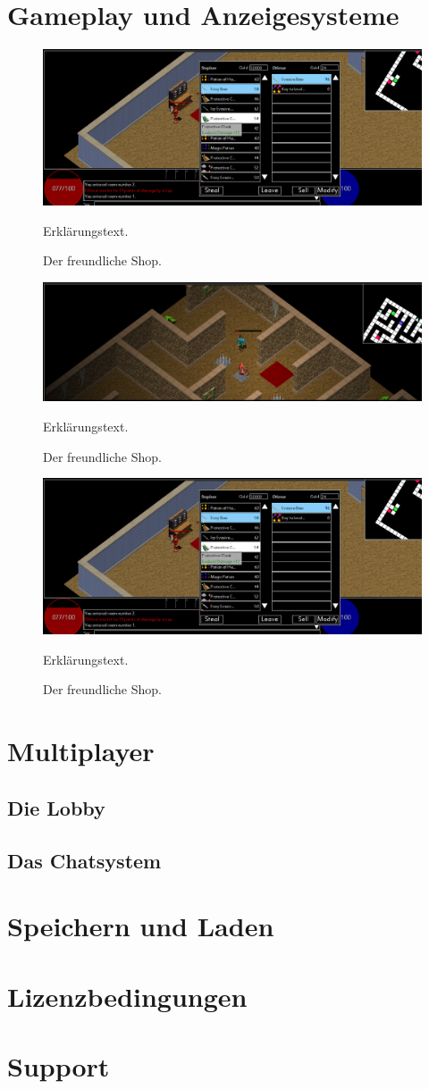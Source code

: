 \documentclass[12pt, a4paper]{scrreprt}
\begin{document}
\chapter{Gameplay und Anzeigesysteme}
\begin{figure}[h]
\includegraphics[width=\textwidth]{img/shop_system}
\caption{Der freundliche Shop.}
\vspace{1cm}
Erklärungstext.
\end{figure}
\begin{figure}[h]
\includegraphics[width=\textwidth]{img/trap_enemy(dead)_transportarrow_objekt(blue)}
\caption{Der freundliche Shop.}
\vspace{1cm}
Erklärungstext.
\end{figure}
\begin{figure}[h]
\includegraphics[width=\textwidth]{img/shop_system}
\caption{Der freundliche Shop.}
\vspace{1cm}
Erklärungstext.
\end{figure}
\chapter{Multiplayer}
\section{Die Lobby}
\section{Das Chatsystem}
\chapter{Speichern und Laden}
\chapter{Lizenzbedingungen}
\chapter{Support}
\end{document}
